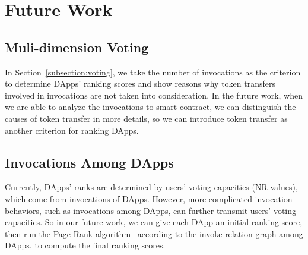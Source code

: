 \section{Future Work}

\subsection{Muli-dimension Voting}
\noindent
In Section~\ref{subsection:voting}, we take the number of invocations as the criterion to determine DApps' ranking scores and show reasons why token transfers involved in invocations are not taken into consideration. In the future work, when we are able to analyze the invocations to smart contract, we can distinguish the causes of token transfer in more details, so we can introduce token transfer as another criterion for ranking DApps.

\subsection{Invocations Among DApps}
\noindent
Currently, DApps' ranks are determined by users' voting capacities (NR values), which come from invocations of DApps. However, more complicated invocation behaviors, such as invocations among DApps, can further transmit users' voting capacities. So in our future work, we can give each DApp an initial ranking score, then run the Page Rank algorithm~\cite{page1999pagerank} according to the invoke-relation graph among DApps, to compute the final ranking scores.
